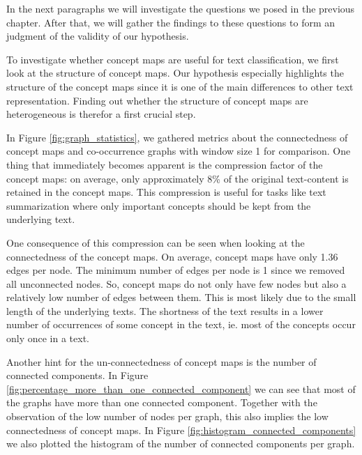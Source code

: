 In the next paragraphs we will investigate the questions we posed in the previous chapter.
After that, we will gather the findings to these questions to form an judgment of the validity of our hypothesis.


To investigate whether concept maps are useful for text classification, we first look at the structure of concept maps.
Our hypothesis especially highlights the structure of the concept maps since it is one of the main differences to other text representation.
Finding out whether the structure of concept maps are heterogeneous is therefor a first crucial step.

In Figure \ref{fig:graph_statistics}, we gathered metrics about the connectedness of concept maps and co-occurrence graphs with window size 1 for comparison.
One thing that immediately becomes apparent is the compression factor of the concept maps: on average, only approximately 8\% of the original text-content is retained in the concept maps.
This compression is useful for tasks like text summarization where only important concepts should be kept from the underlying text.

One consequence of this compression can be seen when looking at the connectedness of the concept maps.
On average, concept maps have only 1.36 edges per node. The minimum number of edges per node is 1 since we removed all unconnected nodes.
So, concept maps do not only have few nodes but also a relatively low number of edges between them.
This is most likely due to the small length of the underlying texts.
The shortness of the text results in a lower number of occurrences of some concept in the text, ie. most of the concepts occur only once in a text.


Another hint for the un-connectedness of concept maps is the number of connected components.
In Figure \ref{fig:percentage_more_than_one_connected_component} we can see that most of the graphs have more than one connected component. Together with the observation of the low number of nodes per graph, this also implies the low connectedness of concept maps.
In Figure \ref{fig:histogram_connected_components} we also plotted the histogram of the number of connected components per graph.

